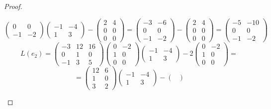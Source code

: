 \documentclass[11pt, fleqn]{article}
\begin{document}
\begin{proof}
\begin{enumerate}
\[\begin{pmatrix}
      0 & 0 \\
      -1 & -2
    \end{pmatrix} \begin{pmatrix}
      -1 & -4\\
      1 & 3
    \end{pmatrix} - \begin{pmatrix}
      2 & 4\\
      0 & 0\\
      0 & 0
    \end{pmatrix} = \begin{pmatrix}
      -3 & -6\\
      0 & 0\\
      -1 & -2
    \end{pmatrix} - \begin{pmatrix}
      2 & 4\\
      0 & 0\\
      0 & 0
    \end{pmatrix} = \begin{pmatrix}
      -5 & -10\\
      0 & 0\\
      -1 & -2
    \end{pmatrix}\]
    \[L(e_2) = \begin{pmatrix}
      -3 & 12 & 16\\
      0 & 1 & 0\\
      -1 & 3 & 5
    \end{pmatrix} \begin{pmatrix}
      0 & -2\\
      1 & 0\\
      0 & 0
    \end{pmatrix} \begin{pmatrix}
      -1 & -4\\
      1 & 3
    \end{pmatrix} - 2 \begin{pmatrix}
      0 & -2\\
      1 & 0\\
      0 & 0
    \end{pmatrix} =\]
    \[= \begin{pmatrix}
      12 & 6 \\
      1 & 0 \\
      3 & 2
    \end{pmatrix} \begin{pmatrix}
      -1 & -4\\
      1 & 3
    \end{pmatrix} - \begin{pmatrix}

\end{pmatrix}\]
\end{enumerate}
\end{proof}
\end{document}
